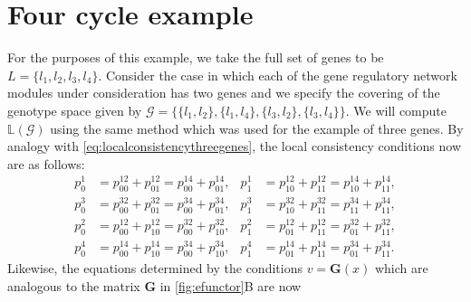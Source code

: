 
\section*{Four cycle example}

For the purposes of this example, we take the full set of genes to be $L = \{ l_1,l_2,l_3,l_4 \}$. Consider the case in which each of the gene regulatory network modules under consideration has two genes and we specify the covering of the genotype space given by $\mathcal{G} = \{\{l_1,l_2 \},\{l_1,l_4 \},\{l_3,l_2\},\{l_3,l_4\} \}$.  We will compute $\mathbb{L}(\mathcal{G})$ using the same method which was used for the example of three genes.  By analogy with \ref{eq:localconsistencythreegenes}, the local consistency conditions now are as follows:
\begin{equation}
\begin{aligned}\label{eq:pparsys}
p^1_0 &= p^{12}_{00} + p^{12}_{01} = p^{14}_{00} + p^{14}_{01}, &
p^1_1 &= p^{12}_{10} + p^{12}_{11} = p^{14}_{10} + p^{14}_{11},\\
p^3_0 &= p^{32}_{00} + p^{32}_{01} = p^{34}_{00} + p^{34}_{01},&
p^3_1 &= p^{32}_{10} + p^{32}_{11} = p^{34}_{11} + p^{34}_{11},\\
p^2_0 &= p^{12}_{00} + p^{12}_{10} = p^{32}_{00} + p^{32}_{10},&
p^2_1 &= p^{12}_{01} + p^{12}_{11} = p^{32}_{01} + p^{32}_{11},\\
p^4_0 &= p^{14}_{00} + p^{14}_{10} = p^{34}_{00} + p^{34}_{10},&
p^4_1 &= p^{14}_{01} + p^{14}_{11} = p^{34}_{01} + p^{34}_{11}.
\end{aligned}
\end{equation}
Likewise, the equations determined by the conditions $v = \mathbf{G}(x)$ which are analogous to the matrix $\mathbf{G}$ in \ref{fig:efunctor}B are now
